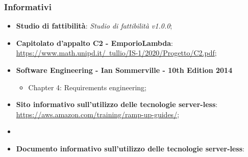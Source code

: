     \subsubsection{Informativi}
    \begin{itemize}
        \item \textbf{Studio di fattibilità}: \textit{Studio di fattibilità v1.0.0};
        \item \textbf{Capitolato d'appalto C2 - EmporioLambda}: \href{https://www.math.unipd.it/~tullio/IS-1/2020/Progetto/C2.pdf}{https://www.math.unipd.it/~tullio/IS-1/2020/Progetto/C2.pdf};
        \item \textbf{Software Engineering - Ian Sommerville - 10th Edition 2014}
        \begin{itemize}
            \item Chapter 4: Requirements engineering;
        \end{itemize}
        \item \textbf{Sito informativo sull'utilizzo delle tecnologie server-less}:\\ \href{https://aws.amazon.com/training/ramp-up-guides/}{https://aws.amazon.com/training/ramp-up-guides/};
        \item \item \textbf{Documento informativo sull'utilizzo delle tecnologie server-less}:\\
    \end{itemize}